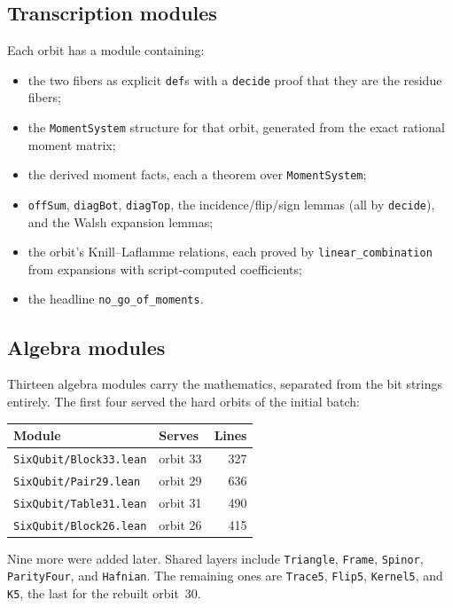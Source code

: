 \documentclass[11pt,a4paper]{article}
\newcommand{\lean}[1]{\texttt{#1}}
\theoremstyle{definition}
\begin{document}
\subsection{Transcription modules}

Each orbit has a module containing:
\begin{itemize}
\item the two fibers as explicit \lean{def}s with a \lean{decide} proof that they
  are the residue fibers;
\item the \lean{MomentSystem} structure for that orbit, generated from the exact
  rational moment matrix;
\item the derived moment facts, each a theorem over \lean{MomentSystem};
\item \lean{offSum}, \lean{diagBot}, \lean{diagTop}, the incidence/flip/sign
  lemmas (all by \lean{decide}), and the Walsh expansion lemmas;
\item the orbit's Knill--Laflamme relations, each proved by
  \lean{linear\_combination} from expansions with script-computed coefficients;
\item the headline \lean{no\_go\_of\_moments}.
\end{itemize}

\subsection{Algebra modules}

Thirteen algebra modules carry the mathematics, separated from the bit strings
entirely.  The first four served the hard orbits of the initial batch:
\begin{center}
\begin{tabular}{llr}
\toprule
Module & Serves & Lines \\
\midrule
\lean{SixQubit/Block33.lean} & orbit 33 & 327 \\
\lean{SixQubit/Pair29.lean}  & orbit 29 & 636 \\
\lean{SixQubit/Table31.lean} & orbit 31 & 490 \\
\lean{SixQubit/Block26.lean} & orbit 26 & 415 \\
\bottomrule
\end{tabular}
\end{center}


\noindent Nine more were added later. Shared layers include \lean{Triangle},
\lean{Frame}, \lean{Spinor}, \lean{ParityFour}, and \lean{Hafnian}. The remaining
ones are \lean{Trace5}, \lean{Flip5}, \lean{Kernel5}, and \lean{K5}, the last for
the rebuilt orbit~30.
\end{document}
